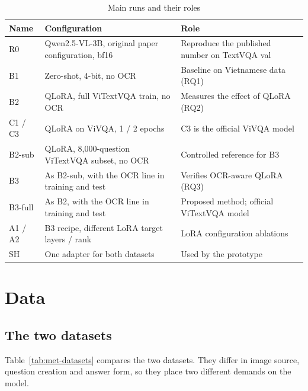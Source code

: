 \begin{table}[htbp]
\caption{Main runs and their roles}
\label{tab:met-runs}
\centering
\small
\begin{tabular}{p{}p{}p{}}
\toprule
\raggedright \textbf{Name} & \raggedright \textbf{Configuration} & \raggedright \textbf{Role} \tabularnewline
\midrule
\raggedright R0 & \raggedright Qwen2.5-VL-3B, original paper configuration, bf16 & \raggedright Reproduce the published number on TextVQA val \tabularnewline
\raggedright B1 & \raggedright Zero-shot, 4-bit, no OCR & \raggedright Baseline on Vietnamese data (RQ1) \tabularnewline
\raggedright B2 & \raggedright QLoRA, full ViTextVQA train, no OCR & \raggedright Measures the effect of QLoRA (RQ2) \tabularnewline
\raggedright C1 / C3 & \raggedright QLoRA on ViVQA, 1 / 2 epochs & \raggedright C3 is the official ViVQA model \tabularnewline
\raggedright B2-sub & \raggedright QLoRA, 8,000-question ViTextVQA subset, no OCR & \raggedright Controlled reference for B3 \tabularnewline
\raggedright B3 & \raggedright As B2-sub, with the OCR line in training and test & \raggedright Verifies OCR-aware QLoRA (RQ3) \tabularnewline
\raggedright B3-full & \raggedright As B2, with the OCR line in training and test & \raggedright Proposed method; official ViTextVQA model \tabularnewline
\raggedright A1 / A2 & \raggedright B3 recipe, different LoRA target layers / rank & \raggedright LoRA configuration ablations \tabularnewline
\raggedright SH & \raggedright One adapter for both datasets & \raggedright Used by the prototype \tabularnewline
\bottomrule
\end{tabular}
\end{table}

\section{Data}
\label{sec:met-data}

\subsection{The two datasets}

Table~\ref{tab:met-datasets} compares the two datasets. They differ in image source,
question creation and answer form, so they place two different demands on the model.

